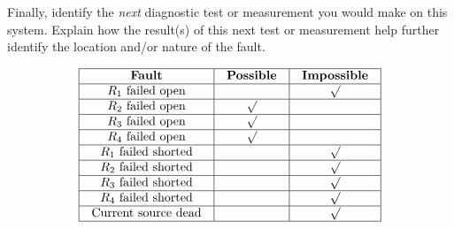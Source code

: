 Finally, identify the {\it next} diagnostic test or measurement you would make on this system.  Explain how the result(s) of this next test or measurement help further identify the location and/or nature of the fault.

\vfil 

\eject







$$\vbox{\offinterlineskip
\halign{\strut
\vrule \quad\hfil # \ \hfil & 
\vrule \quad\hfil # \ \hfil & 
\vrule \quad\hfil # \ \hfil \vrule \cr
\noalign{\hrule}
%
{\bf Fault} & {\bf Possible} & {\bf Impossible} \cr
%
\noalign{\hrule}
%
$R_1$ failed open &  & $\surd$ \cr
%
\noalign{\hrule}
%
$R_2$ failed open & $\surd$ &  \cr
%
\noalign{\hrule}
%
$R_3$ failed open & $\surd$ &  \cr
%
\noalign{\hrule}
%
$R_4$ failed open & $\surd$ &  \cr
%
\noalign{\hrule}
%
$R_1$ failed shorted &  & $\surd$ \cr
%
\noalign{\hrule}
%
$R_2$ failed shorted &  & $\surd$ \cr
%
\noalign{\hrule}
%
$R_3$ failed shorted &  & $\surd$ \cr
%
\noalign{\hrule}
%
$R_4$ failed shorted &  & $\surd$ \cr
%
\noalign{\hrule}
%
Current source dead &  & $\surd$ \cr
%
\noalign{\hrule}
} %
}$$ %











